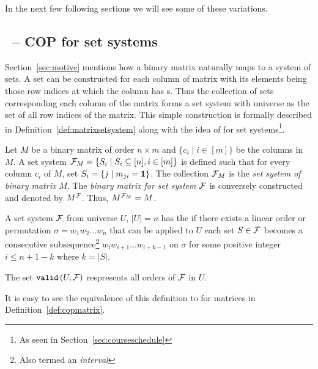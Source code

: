 In the next few following sections we will see some of these
variations.




\subsection{\PQRtree\ --  COP for set systems}
\label{sec:surveycertalgo}

Section~\ref{sec:motive} mentions how a binary matrix naturally maps
to a system of sets.  A set can be constructed for each column of
matrix with its elements being those row indices at which the column
has \un s. Thus the collection of sets corresponding each column of
the matrix forms a set system with universe as the set of all row
indices of the matrix.  This simple construction is formally described
in Definition~\ref{def:matrixsetsystem} along with the idea of \cop
for set systems\footnote{As seen in Section~\ref{sec:courseschedule}}.

\begin{definition}%
  \label{def:matrixsetsystem}%
  Let $M$ be a binary matrix of order $n \times m$ and $\{c_i \mid i
  \in [m]\}$ be the columns in $M$.  A set system ${\cal F}_{M} = \{S_i
  \mid S_i \subseteq [n], i \in [m]\}$ is defined such that for every
  column $c_i$ of $M$, set $S_i = \{j \mid m_{ji} = \textbf{1} \}$. The
  collection ${\cal F}_M$ is the {\em set system of binary matrix} $M$. The
  {\em binary matrix for set system} ${\cal F}$ is conversely constructed
  and denoted by $M^{\cal F}$. Thus, $M^{{\cal F}_M} = M$.%
  \par\noindent%
  A set system ${\cal F}$ from universe $U$, $|U| = n$ has the
  {\em \cop} if there exists a linear order or 
  permutation $\sigma = w_1w_2\ldots w_n$ that can be applied to $U$ \stt each set $S \in
  {\cal F}$ becomes a consecutive subsequence\footnote{Also termed an {\em interval}} $w_{i}w_{i+1}\ldots
  w_{i+k-1}$ on $\sigma$ for some positive integer $i \le n+1-k$ where  $k = |S|$.
  \par\noindent%
  The set ${\tt valid}\left(U,{\cal F}\right)$ respresents all \COP orders of ${\cal F}$ in $U$.
  \dstop
\end{definition}

It is easy to see the equivalence of this definition to \COP for
matrices in Definition~\ref{def:copmatrix}.

